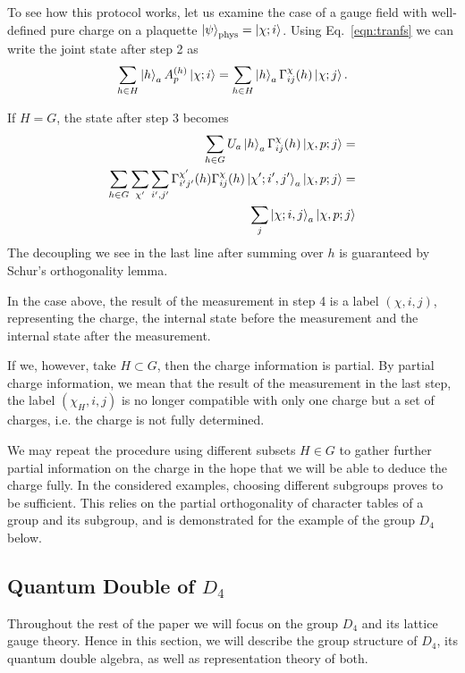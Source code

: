 \documentclass[two column]{article}
\begin{document}
To see how this protocol works, let us examine the case of a  gauge field with well-defined pure charge on a plaquette  $\ket{\psi}_\text{phys} = \ket{\chi; i}$. Using  Eq.~\eqref{eqn:tranfs} we can write the joint state after step 2 as
\begin{equation}
    \sum_{h \in H} \ket{h}_a A^{(h)}_p \ket{\chi; i} = \sum_{h \in H} \ket{h}_a \Gamma^{\chi}_{ij}(h) \ket{\chi; j}.
\end{equation}

If $H = G$, the state after step 3 becomes\begin{equation}
    \begin{split}
        \sum_{h \in G} U_a\ket{h}_a \Gamma^{\chi}_{ij}(h) \ket{\chi, p; j} = \\
        \sum_{h \in G} \sum_{\chi'}\sum_{i', j'}  \Gamma^{\chi'}_{i'j'}(h)\Gamma^{\chi}_{ij}(h) \ket{\chi'; i', j'}_a \ket{\chi, p; j} =\\
        \sum_j\ket{\chi; i, j}_a \ket{\chi, p; j}
    \end{split}
\end{equation}
The decoupling we see in the last line after summing over $h$ is guaranteed by Schur's orthogonality lemma.

In the case above, the result of the measurement in step 4 is a label $(\chi, i, j)$, representing the charge, the internal state before the measurement and the internal state after the measurement.

If we, however, take $H \subset G$, then the charge information is partial.
By partial charge information, we mean that the result of the measurement in the last step, the label $(\chi_H, i, j)$ is no longer compatible with only one charge but a set of charges, i.e. the charge is not fully determined.

We may repeat the procedure using different subsets $H \in G$ to gather further partial information on the charge in the hope that we will be able to deduce the charge fully. In the considered examples, choosing different subgroups proves to be sufficient. This relies on the partial orthogonality of character tables of a group and its subgroup, and is demonstrated for the example of the group $D_4$ below.

\subsection{Quantum Double of $D_4$}

Throughout the rest of the paper we will focus on the group $D_4$ and its lattice gauge theory.
Hence in this section, we will describe the group structure of $D_4$, its quantum double algebra, as well as representation theory of both.
\end{document}
